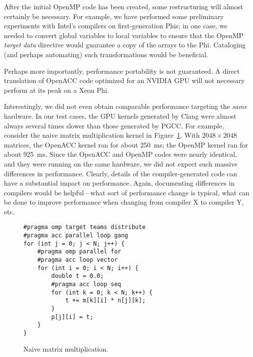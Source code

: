 \documentclass{sig-alternate-05-2015}
\begin{document}
After the initial OpenMP code has been created, some restructuring will almost
certainly be necessary.  For example, we have performed some preliminary
experiments with Intel's compilers on first-generation Phis; in one case, we
needed to convert global variables to local variables to ensure that the OpenMP
\emph{target data} directive would guarantee a copy of the arrays to the Phi.
Cataloging (and perhaps automating) such transformations would be beneficial.

Perhaps more importantly, performance portability is not guaranteed.  A direct
translation of OpenACC code optimized for an NVIDIA GPU will not necessary
perform at its peak on a Xeon Phi.

Interestingly, we did not even obtain comparable performance targeting the
\emph{same} hardware.  In our test cases, the GPU kernels generated by Clang
were almost always several times slower than those generated by PGCC.  For
example, consider the naive matrix multiplication kernel in
Figure~\ref{fig:matmul}.  With $2048 \times 2048$ matrices, the OpenACC kernel
ran for about 250~ms; the OpenMP kernel ran for about 925~ms.  Since the
OpenACC and OpenMP codes were nearly identical, and they were running on the
same hardware, we did not expect such massive differences in performance.
Clearly, details of the compiler-generated code can have a substantial impact
on performance.  Again, documenting differences in compilers would be
helpful---what sort of performance change is typical, what can be done to
improve performance when changing from compiler X to compiler Y, etc.

\begin{figure}
\begin{verbatim}
#pragma omp target teams distribute
#pragma acc parallel loop gang
for (int j = 0; j < N; j++) {
    #pragma omp parallel for
    #pragma acc loop vector
    for (int i = 0; i < N; i++) {
        double t = 0.0;
        #pragma acc loop seq
        for (int k = 0; k < N; k++) {
            t += m[k][i] * n[j][k];
        }
        p[j][i] = t;
    }
}
\end{verbatim}
\caption{Naive matrix multiplication.}
\label{fig:matmul}
\end{figure}




%


%
%
\end{document}
